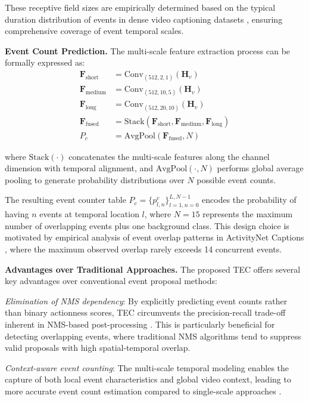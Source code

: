 These receptive field sizes are empirically determined based on the typical duration distribution of events in dense video captioning datasets \cite{Krishna2017-pw,Zhou2018-eq}, ensuring comprehensive coverage of event temporal scales.

\textbf{Event Count Prediction.}
The multi-scale feature extraction process can be formally expressed as:
\begin{align}
  \mathbf{F}_{\text{short}} &= \text{Conv}_{(512, 2, 1)} (\mathbf{H}_v) \\
  \mathbf{F}_{\text{medium}} &= \text{Conv}_{(512, 10, 5)} (\mathbf{H}_v) \\
  \mathbf{F}_{\text{long}} &= \text{Conv}_{(512, 20, 10)} (\mathbf{H}_v) \\
  \mathbf{F}_{\text{fused}} &= \text{Stack}(\mathbf{F}_{\text{short}}, \mathbf{F}_{\text{medium}}, \mathbf{F}_{\text{long}}) \\
  P_c &= \text{AvgPool}(\mathbf{F}_{\text{fused}}, N)
\end{align}

where $\text{Stack}(\cdot)$ concatenates the multi-scale features along the channel dimension with temporal alignment, and $\text{AvgPool}(\cdot, N)$ performs global average pooling to generate probability distributions over $N$ possible event counts.

The resulting event counter table $P_c = \{p_{l,n}^c\}_{l=1,n=0}^{L, N-1}$ encodes the probability of having $n$ events at temporal location $l$, where $N=15$ represents the maximum number of overlapping events plus one background class. This design choice is motivated by empirical analysis of event overlap patterns in ActivityNet Captions \cite{Krishna2017-pw}, where the maximum observed overlap rarely exceeds 14 concurrent events.

\textbf{Advantages over Traditional Approaches.}
The proposed TEC offers several key advantages over conventional event proposal methods:

\textit{Elimination of NMS dependency}: By explicitly predicting event counts rather than binary actionness scores, TEC circumvents the precision-recall trade-off inherent in NMS-based post-processing \cite{hosang2017learning}. This is particularly beneficial for detecting overlapping events, where traditional NMS algorithms tend to suppress valid proposals with high spatial-temporal overlap.

\textit{Context-aware event counting}: The multi-scale temporal modeling enables the capture of both local event characteristics and global video context, leading to more accurate event count estimation compared to single-scale approaches \cite{yuan2017temporal,long2019gaussian}.

